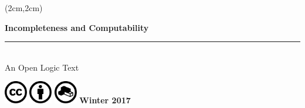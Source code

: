 \AtBeginShipoutNext{\AtBeginShipoutNext{\AtBeginShipoutDiscard}}

\begin{titlingpage}
  \pagecolor{leadbeater}
  \begin{textblock*}{14cm}(2cm,2cm)%
    \begin{raggedright}
      \fontsize{32pt}{34pt}\selectfont\bfseries\sffamily%
      Incompleteness and Computability\\
      \normalfont\fontsize{18pt}{0pt}\selectfont\bfseries\itshape%
      \rule{14cm}{5pt}\\[5pt]
      An Open Logic Text
    \end{raggedright}



    
\par\noindent
\vskip 15cm

\noindent
\includegraphics[width=1cm]{assets/cc.pdf}
\includegraphics[width=1cm]{assets/by.pdf}
\includegraphics[width=1cm]{assets/remix.pdf}
\normalfont\fontsize{16pt}{0pt}\selectfont\bfseries\sffamily%
\hfill Winter 2017%
\end{textblock*}
\
\end{titlingpage}

\nopagecolor

